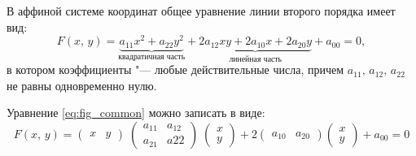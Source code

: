\begin{definition}
  В аффиной системе координат общее уравнение линии второго порядка имеет вид:  
  \begin{equation}
    \label{eq:fig_common}
    F(x,\, y) = \underbrace{a_{11}x^2 + a_{22}y^2}_{\text{квадратичная часть}} + 
  \underbrace{2a_{12}xy + 2a_{10}x + 2a_{20}y}_{\text{линейная часть}} + a_{00} = 0,
  \end{equation}
  в котором коэффициенты "--- любые действительные числа, причем $a_{11},\, a_{12}, \, a_{22}$ не равны одновременно нулю.
\end{definition}

Уравнение \ref{eq:fig_common} можно записать в виде:
$$
  F(x, \, y) = \begin{pmatrix} x & y \end{pmatrix} \; \begin{pmatrix}
    a_{11} & a_{12} \\
    a_{21} & a{22}
  \end{pmatrix} \; \begin{pmatrix} x \\ y \end{pmatrix} + 2 \begin{pmatrix} a_{10} & a_{20} \end{pmatrix} \begin{pmatrix} x \\ y \end{pmatrix} + a_{00} = 0
$$

